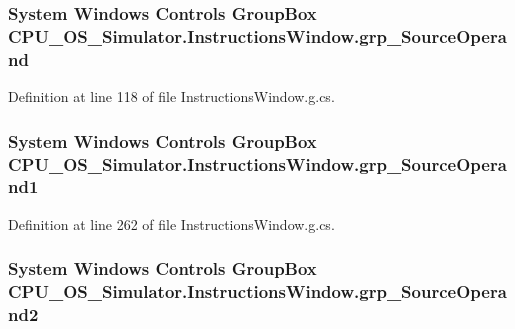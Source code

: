 \subsubsection[{grp\+\_\+\+Source\+Operand}]{\setlength{\rightskip}{0pt plus 5cm}System Windows Controls Group\+Box C\+P\+U\+\_\+\+O\+S\+\_\+\+Simulator.\+Instructions\+Window.\+grp\+\_\+\+Source\+Operand\hspace{0.3cm}{\ttfamily [package]}}\label{class_c_p_u___o_s___simulator_1_1_instructions_window_ace26d2d0e3de3715d755e91ab04a054a}


Definition at line 118 of file Instructions\+Window.\+g.\+cs.

\hypertarget{class_c_p_u___o_s___simulator_1_1_instructions_window_a74e13776576d1a6ee5767e3fc8f6ec7f}{}
\subsubsection[{grp\+\_\+\+Source\+Operand1}]{\setlength{\rightskip}{0pt plus 5cm}System Windows Controls Group\+Box C\+P\+U\+\_\+\+O\+S\+\_\+\+Simulator.\+Instructions\+Window.\+grp\+\_\+\+Source\+Operand1\hspace{0.3cm}{\ttfamily [package]}}\label{class_c_p_u___o_s___simulator_1_1_instructions_window_a74e13776576d1a6ee5767e3fc8f6ec7f}


Definition at line 262 of file Instructions\+Window.\+g.\+cs.

\hypertarget{class_c_p_u___o_s___simulator_1_1_instructions_window_ad37aae3614abd76749236a7739fbc18b}{}
\subsubsection[{grp\+\_\+\+Source\+Operand2}]{\setlength{\rightskip}{0pt plus 5cm}System Windows Controls Group\+Box C\+P\+U\+\_\+\+O\+S\+\_\+\+Simulator.\+Instructions\+Window.\+grp\+\_\+\+Source\+Operand2\hspace{0.3cm}{\ttfamily [package]}}\label{class_c_p_u___o_s___simulator_1_1_instructions_window_ad37aae3614abd76749236a7739fbc18b}


